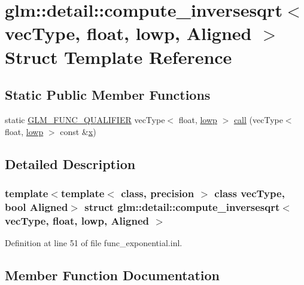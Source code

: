\hypertarget{structglm_1_1detail_1_1compute__inversesqrt_3_01vec_type_00_01float_00_01lowp_00_01_aligned_01_4}{}\section{glm\+::detail\+::compute\+\_\+inversesqrt$<$ vec\+Type, float, lowp, Aligned $>$ Struct Template Reference}
\label{structglm_1_1detail_1_1compute__inversesqrt_3_01vec_type_00_01float_00_01lowp_00_01_aligned_01_4}
\subsection*{Static Public Member Functions}
\begin{DoxyCompactItemize}
\item 
static \mbox{\hyperlink{setup_8hpp_a33fdea6f91c5f834105f7415e2a64407}{G\+L\+M\+\_\+\+F\+U\+N\+C\+\_\+\+Q\+U\+A\+L\+I\+F\+I\+ER}} vec\+Type$<$ float, \mbox{\hyperlink{namespaceglm_a0f04f086094c747d227af4425893f545ae161af3fc695e696ce3bf69f7332bc2d}{lowp}} $>$ \mbox{\hyperlink{structglm_1_1detail_1_1compute__inversesqrt_3_01vec_type_00_01float_00_01lowp_00_01_aligned_01_4_ac10bd6d36d1b22d497cc0ab187fe22ed}{call}} (vec\+Type$<$ float, \mbox{\hyperlink{namespaceglm_a0f04f086094c747d227af4425893f545ae161af3fc695e696ce3bf69f7332bc2d}{lowp}} $>$ const \&\mbox{\hyperlink{glad_8h_a92d0386e5c19fb81ea88c9f99644ab1d}{x}})
\end{DoxyCompactItemize}


\subsection{Detailed Description}
\subsubsection*{template$<$template$<$ class, precision $>$ class vec\+Type, bool Aligned$>$\newline
struct glm\+::detail\+::compute\+\_\+inversesqrt$<$ vec\+Type, float, lowp, Aligned $>$}



Definition at line 51 of file func\+\_\+exponential.\+inl.



\subsection{Member Function Documentation}
\mbox{\label{structglm_1_1detail_1_1compute__inversesqrt_3_01vec_type_00_01float_00_01lowp_00_01_aligned_01_4_ac10bd6d36d1b22d497cc0ab187fe22ed}} 
